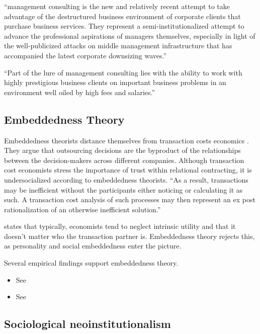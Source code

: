 \documentclass[12pt]{article}
\begin{document}
``management consulting is the new and relatively recent attempt to take
advantage of the destructured business environment of corporate clients
that purchase business services. They represent a semi-institutionalized
attempt to advance the professional aspirations of managers themselves,
especially in light of the well-publicized attacks on middle management
infrastructure that has accompanied the latest corporate downsizing
waves.'' \citep[ 35]{leicht2006}

``Part of the lure of management consulting lies with the ability to
work with highly prestigious business clients on important business
problems in an environment well oiled by high fees and salaries.''
\citep[ 37]{leicht2006}

\hypertarget{embeddedness-theory}{%
\subsection{Embeddedness Theory}\label{embeddedness-theory}}

Embeddedness theorists distance themselves from transaction costs
economics \citep[ 14-16]{armbruster2006}. They argue that outsourcing
decisions are the byproduct of the relationships between the
decision-makers across different companies. Although transaction cost
economists stress the importance of trust within relational contracting,
it is undersocialized according to embeddedness theorists. ``As a
result, transactions may be inefficient without the participants either
noticing or calculating it as such. A transaction cost analysis of such
processes may then represent an ex post rationalization of an otherwise
inefficient solution.'' \citep[ 15]{armbruster2006}

\citet[992]{nooteboom1996} states that typically, economists tend to
neglect intrinsic utility and that it doesn't matter who the transaction
partner is. Embeddedness theory rejects this, as personality and social
embeddedness enter the picture.

Several empirical findings support embeddedness theory.

\begin{itemize}
\item
  See \citep[ 16]{armbruster2006}
\item
  See \citep{kitay2004}
\end{itemize}

\hypertarget{sociological-neoinstitutionalism}{%
\subsection{Sociological
neoinstitutionalism}\label{sociological-neoinstitutionalism}}
\end{document}
